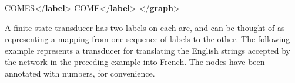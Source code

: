 \begin{shaded}
\hspace*{1em}COMES{</\textbf{label}>}\mbox{}\newline 
{}\mbox{}\newline 
{}\mbox{}\newline 
\hspace*{1em}COME{</\textbf{label}>}\mbox{}\newline 
{}\mbox{}\newline 
{</\textbf{graph}>}\end{shaded}\egroup\par \par
A finite state transducer has two labels on each arc, and can be thought of as representing a mapping from one sequence of labels to the other. The following example represents a transducer for translating the English strings accepted by the network in the preceding example into French. The nodes have been annotated with numbers, for convenience.\par
